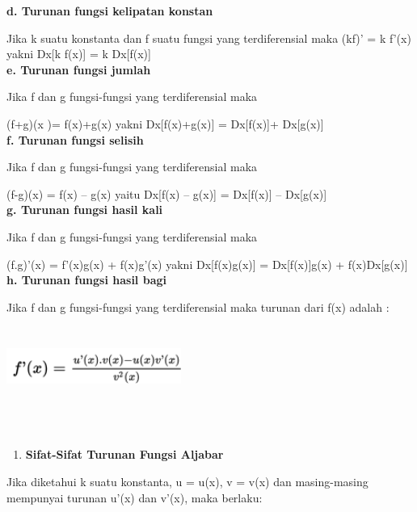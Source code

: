 \documentclass[11pt,fleqn]{book} %
\begin{document}
\noindent 
\noindent \textbf{d. Turunan fungsi kelipatan konstan}

\noindent 
Jika  k  suatu konstanta dan  f  suatu fungsi yang terdiferensial maka 
\noindent 
(kf)' = k f'(x)  yakni  Dx[k f(x)]  =  k Dx[f(x)]\\

\noindent 
\noindent \textbf{e. Turunan fungsi jumlah}

\noindent 
Jika  f  dan  g  fungsi-fungsi yang terdiferensial maka 

\noindent 
(f+g)(x )= f(x)+g(x)  yakni  Dx[f(x)+g(x)] = Dx[f(x)]+ Dx[g(x)]\\

\noindent 
\noindent \textbf{f. Turunan fungsi selisih}

\noindent 
Jika  f  dan  g  fungsi-fungsi yang terdiferensial maka

\noindent 
(f-g)(x) = f(x) – g(x)   yaitu  Dx[f(x) – g(x)] = Dx[f(x)] – Dx[g(x)]\\

\noindent 
\noindent \textbf{g. Turunan fungsi hasil kali}

\noindent 
Jika f dan g fungsi-fungsi yang terdiferensial maka 

\noindent 
(f.g)'(x) = f'(x)g(x) + f(x)g'(x)  yakni  Dx[f(x)g(x)] = Dx[f(x)]g(x) + f(x)Dx[g(x)]\\

\noindent 
\noindent \textbf{h. Turunan fungsi hasil bagi}

\noindent 
Jika f dan g fungsi-fungsi yang terdiferensial maka turunan dari f(x) adalah :
\noindent 

\noindent 
\begin{center}
\includegraphics*[width=2.25in, height=1.01in]{Pictures/TurunanFungsi12.png}
\end{center}

\noindent 
 \\
 
\noindent
\begin{enumerate}
\item \textbf{Sifat-Sifat Turunan Fungsi Aljabar }
\end{enumerate}

\noindent
Jika diketahui k suatu konstanta, u = u(x),  v = v(x) dan masing-masing mempunyai turunan u'(x) dan v'(x), maka berlaku:
 
\end{document}
